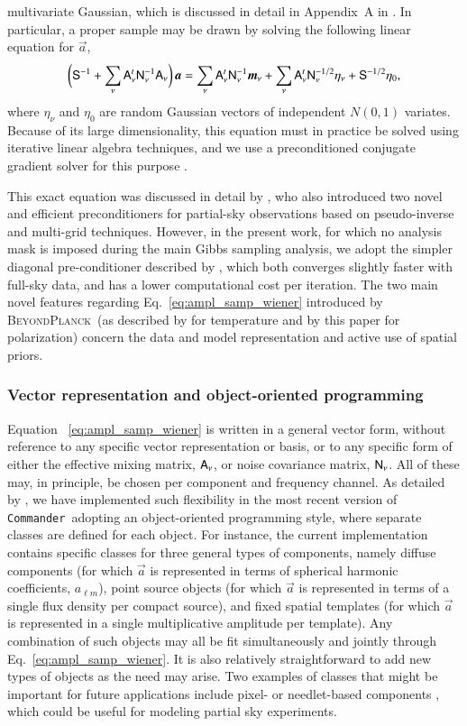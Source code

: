\documentclass[twocolumn]{aa}
\def\commander{\texttt{Commander}}
\newcommand{\A}[0]{\tens{A}}
\renewcommand{\a}[0]{\vec{a}}
\newcommand{\m}[0]{\vec{m}}
\newcommand{\N}[0]{\tens{N}}
\renewcommand{\S}[0]{\tens{S}}
\newcommand{\BP}{\textsc{BeyondPlanck}}
\newcommand{\?}[1]{\textcolor{red}{{\bf [#1]}}}
\begin{document}
multivariate Gaussian, which is discussed in detail in Appendix~A in
\citet{bp01}. In particular, a proper sample may be drawn by solving the
following linear equation for $\a$,
\begin{equation}
  \biggl(\S^{-1} + \sum_{\nu}\A^t_{\nu}\N_{\nu}^{-1}\A_{\nu}\biggr)\,\a = 
  \sum_\nu\A_{\nu}^t\N_\nu^{-1}\m_{\nu} + \sum_{\nu}\A_{\nu}^t\N_{\nu}^{-1/2}\eta_{\nu} +
  \S^{-1/2}\eta_{0},
\label{eq:ampl_samp_wiener}
\end{equation}
where $\eta_\nu$ and $\eta_0$ are random Gaussian vectors of independent $N(0,
1)$ variates. Because of its large dimensionality, this equation must in
practice be solved using iterative linear algebra techniques, and we use a
preconditioned conjugate gradient solver for this purpose \citep[e.g.,][]{shewchuk:1994}.

This exact equation was discussed in detail by \citet{seljebotn:2019},
who also introduced two novel and efficient preconditioners for
partial-sky observations based on pseudo-inverse and multi-grid
techniques. However, in the present work, for which no analysis mask
is imposed during the main Gibbs sampling analysis, we adopt the
simpler diagonal pre-conditioner described by \citet{eriksen2008},
which both converges slightly faster with full-sky data, and has a
lower computational cost per iteration. The two main novel features
regarding Eq.~\eqref{eq:ampl_samp_wiener} introduced by \BP\ (as
described by \citet{bp13} for temperature and by this paper for
polarization) concern the data and model representation and active use
of spatial priors.

\subsubsection{Vector representation and object-oriented programming}

Equation ~\eqref{eq:ampl_samp_wiener} is written in a general vector
form, without reference to any specific vector representation or
basis, or to any specific form of either the effective mixing matrix,
$\A_{\nu}$, or noise covariance matrix, $\N_{\nu}$. All of these may,
in principle, be chosen per component and frequency channel. As
detailed by \citet{bp03}, we have implemented such flexibility in the
most recent version of \commander\ adopting an object-oriented
programming style, where separate classes are defined for each
object. For instance, the current implementation contains specific
classes for three general types of components, namely diffuse
components (for which $\a$ is represented in terms of spherical
harmonic coefficients, $a_{\ell m}$), point source objects (for which
$\a$ is represented in terms of a single flux density per compact
source), and fixed spatial templates (for which $\a$ is represented in
a single multiplicative amplitude per template). Any combination of
such objects may all be fit simultaneously and jointly through
Eq.~\eqref{eq:ampl_samp_wiener}. It is also relatively straightforward
to add new types of objects as the need may arise. Two examples of
classes that might be important for future applications include pixel-
or needlet-based components \citep[e.g.,][]{marinucci:2008}, which
could be useful for modeling partial sky experiments.
\end{document}
